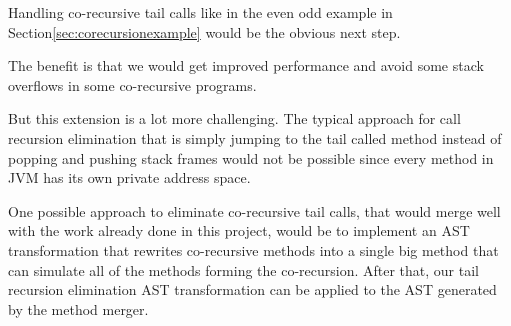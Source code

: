 Handling co-recursive tail calls like in the even odd example in Section\ref{sec:corecursionexample} would be the obvious next step.

The benefit is that we would get improved performance and avoid some stack overflows in some co-recursive programs.

But this extension is a lot more challenging. The typical approach for call recursion elimination that is simply jumping to the tail called method instead of popping and pushing stack frames would not be possible since every method in JVM has its own private address space.

One possible approach to eliminate co-recursive tail calls, that would merge well with the work already done in this project, would be to implement an AST transformation that rewrites co-recursive methods into a single big method that can simulate all of the methods forming the co-recursion. After that, our tail recursion elimination AST transformation can be applied to the AST generated by the method merger.
